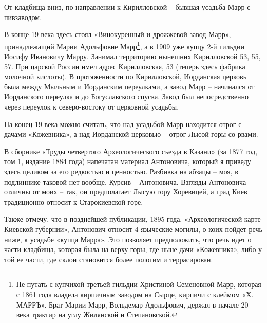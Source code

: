 От кладбища вниз, по направлении к Кирилловской – бывшая усадьба Марр с пивзаводом.

В конце 19 века здесь стоял «Винокуренный и дрожжевой завод Марр», принадлежащий Марии Адольфовне Марр\footnote{Не путать с купчихой третьей гильдии Христиной Семеновной Марр, которая с 1861 года владела кирпичным заводом на Сырце, кирпичи с клеймом «Х. МАРРЪ». Брат Марии Марр, Вольдемар Адольфович, держал в начале 20 века трактир на углу Жилянской и Степановской.}, а в 1909 уже купцу 2-й гильдии Иосифу Ивановичу Марру. Занимал территорию нынешних Кирилловской 53, 55, 57. При царской России имел адрес Кирилловская, 53 (теперь здесь фабрика молочной кислоты). В протяженности по Кирилловской, Иорданская церковь была между Мыльным и Иорданским переулками, а завод Марр – начинался от Иорданского переулка и до Богуславского спуска. Завод был непосредственно через переулок к северо-востоку от церковной усадьбы.

На конец 19 века можно считать, что над усадьбой Марр находится отрог с дачами «Кожевника», а над Иорданской церковью – отрог Лысой горы со рвами. 


В сборнике «Труды четвертого Археологического съезда в Казани» (за 1877 год, том 1, издание 1884 года) напечатан материал Антоновича, который я приведу здесь целиком за его редкостью и ценностью. Разбивка на абзацы – моя, в подлиннике таковой нет вообще. Курсив – Антоновича. Взгляды Антоновича отличны от моих – так, он предполагает Лысую гору Хоревицей, а град Киев традиционно относит к Старокиевской горе. 

Также отмечу, что в позднейшей публикации, 1895 года, «Археологической карте Киевской губернии», Антонович относит 4 языческие могилы, о коих пойдет речь ниже, к усадьбе «купца Марра». Это позволяет предположить, что речь идет о части кладбища, которая была на верху горы, где ныне дачи «Кожевника», либо у той ее части, где склон становится более пологим и террасирован.

